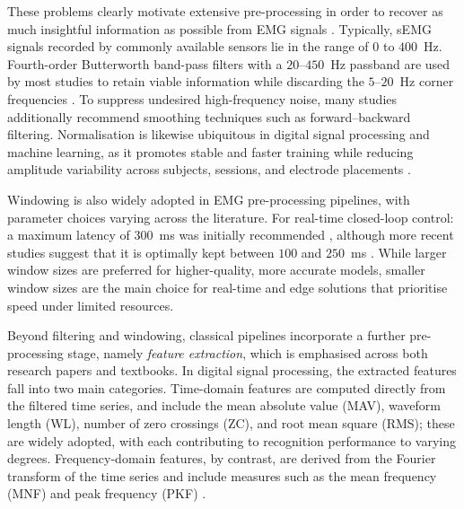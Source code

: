 \documentclass[12pt,DIV16,BCOR12mm,a4paper,footinclude=false,headinclude,parskip=half-,twoside,openright,cleardoublepage=empty,toc=index,bibliography=totoc,listof=totoc]{scrreprt}
\numberwithin{equation}{chapter}
\begin{document}
    These problems clearly motivate extensive pre-processing in order to recover as much
    insightful information as possible from EMG signals \cite{delucaFilteringSurfaceEMG2010}.
    Typically, sEMG signals recorded by commonly available sensors lie in the range of $0$ to
    $400$~Hz. Fourth-order Butterworth band-pass filters with a $20$--$450$~Hz passband are used by
    most studies to retain viable information while discarding the $5$--$20$~Hz corner frequencies
    \cite{delucaFilteringSurfaceEMG2010}. To suppress undesired high-frequency noise, many studies
    additionally recommend smoothing techniques such as forward--backward filtering. Normalisation
    is likewise ubiquitous in digital signal processing and machine learning, as it promotes stable
    and faster training while reducing amplitude variability across subjects, sessions, and electrode
    placements \cite{coteallardDeepLearningElectromyographic2019}.

    Windowing is also widely adopted in EMG pre-processing pipelines, with parameter choices varying
    across the literature. For real-time closed-loop control: a maximum
    latency of $300$~ms was initially recommended \cite{hudginsNewStrategyMultifunction1993}, although
    more recent studies suggest that it is optimally kept between $100$ and $250$~ms
    \cite{coteallardDeepLearningElectromyographic2019, smithDeterminingOptimalWindow2011}. While larger
    window sizes are preferred for higher-quality, more accurate models, smaller window sizes are the
    main choice for real-time and edge solutions that prioritise speed under limited resources.

    Beyond filtering and windowing, classical pipelines incorporate a further pre-processing stage,
    namely \emph{feature extraction}, which is emphasised across both research papers and textbooks.
    In digital signal processing, the extracted features fall into two main categories. Time-domain
    features are computed directly from the filtered time series, and include the mean absolute value
    (MAV), waveform length (WL), number of zero crossings (ZC), and root mean square (RMS); these are
    widely adopted, with each contributing to recognition performance to varying degrees. Frequency-domain
    features, by contrast, are derived from the Fourier transform of the time series and include measures
    such as the mean frequency (MNF) and peak frequency (PKF) \cite{phinyomarkFeatureReductionSelection2012}.
\end{document}
